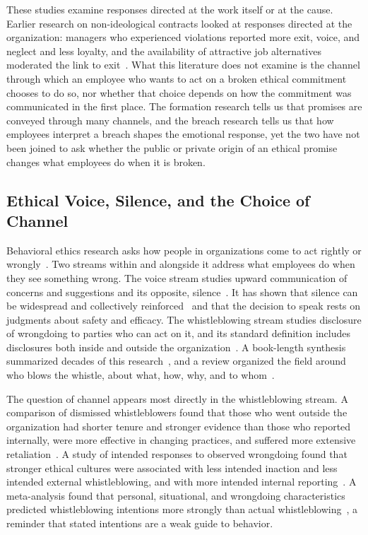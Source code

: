 \documentclass[12pt,a4paper]{article}
\theoremstyle{definition}
\begin{document}
These studies examine responses directed at the work itself or at the cause. Earlier research on non-ideological contracts looked at responses directed at the organization: managers who experienced violations reported more exit, voice, and neglect and less loyalty, and the availability of attractive job alternatives moderated the link to exit~\citep{turnley1999impact}. What this literature does not examine is the channel through which an employee who wants to act on a broken ethical commitment chooses to do so, nor whether that choice depends on how the commitment was communicated in the first place. The formation research tells us that promises are conveyed through many channels, and the breach research tells us that how employees interpret a breach shapes the emotional response, yet the two have not been joined to ask whether the public or private origin of an ethical promise changes what employees do when it is broken.

\subsection{Ethical Voice, Silence, and the Choice of Channel}

Behavioral ethics research asks how people in organizations come to act rightly or wrongly~\citep{trevino2006behavioral}. Two streams within and alongside it address what employees do when they see something wrong. The voice stream studies upward communication of concerns and suggestions and its opposite, silence~\citep{morrison2014employee,morrison2023employee}. It has shown that silence can be widespread and collectively reinforced~\citep{morrison2000organizational} and that the decision to speak rests on judgments about safety and efficacy. The whistleblowing stream studies disclosure of wrongdoing to parties who can act on it, and its standard definition includes disclosures both inside and outside the organization~\citep{near1985organizational}. A book-length synthesis summarized decades of this research~\citep{miceli2008whistleblowing}, and a review organized the field around who blows the whistle, about what, how, why, and to whom~\citep{culiberg2017evolution}.

The question of channel appears most directly in the whistleblowing stream. A comparison of dismissed whistleblowers found that those who went outside the organization had shorter tenure and stronger evidence than those who reported internally, were more effective in changing practices, and suffered more extensive retaliation~\citep{dworkin1998internal}. A study of intended responses to observed wrongdoing found that stronger ethical cultures were associated with less intended inaction and less intended external whistleblowing, and with more intended internal reporting~\citep{kaptein2011inaction}. A meta-analysis found that personal, situational, and wrongdoing characteristics predicted whistleblowing intentions more strongly than actual whistleblowing~\citep{mesmermagnus2005whistleblowing}, a reminder that stated intentions are a weak guide to behavior.
\end{document}

